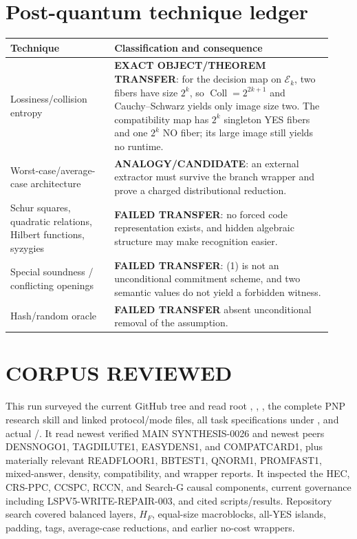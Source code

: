 \documentclass[11pt]{article}
\begin{document}
\section{Post-quantum technique ledger}
\begin{longtable}{p{0.30\linewidth}p{0.63\linewidth}}
\toprule Technique & Classification and consequence\\ \midrule\endhead
Lossiness/collision entropy & \textbf{EXACT OBJECT/THEOREM TRANSFER}: for
the decision map on \(\mathcal E_k\), two fibers have size \(2^k\), so
\(\operatorname{Coll}=2^{2k+1}\) and Cauchy--Schwarz yields only image size
two.  The compatibility map has \(2^k\) singleton YES fibers and one \(2^k\)
NO fiber; its large image still yields no runtime.\\
Worst-case/average-case architecture & \textbf{ANALOGY/CANDIDATE}: an
external extractor must survive the branch wrapper and prove a charged
distributional reduction.\\
Schur squares, quadratic relations, Hilbert functions, syzygies &
\textbf{FAILED TRANSFER}: no forced code representation exists, and hidden
algebraic structure may make recognition easier.\\
Special soundness / conflicting openings & \textbf{FAILED TRANSFER}: (1) is
not an unconditional commitment scheme, and two semantic values do not yield
a forbidden witness.\\
Hash/random oracle & \textbf{FAILED TRANSFER} absent unconditional removal of
the assumption.\\ \bottomrule
\end{longtable}

\section{CORPUS REVIEWED}
This run surveyed the current GitHub tree and read root ,
, , the complete PNP research skill and linked
protocol/mode files, all task specifications under , and actual
/.  It read newest verified MAIN
SYNTHESIS-0026 and newest peers DENSNOGO1, TAGDILUTE1, EASYDENS1, and
COMPATCARD1, plus materially relevant READFLOOR1, BBTEST1, QNORM1, PROMFAST1,
mixed-answer, density, compatibility, and wrapper reports.  It inspected the
HEC, CRS-PPC, CCSPC, RCCN, and Search-G causal components, current governance
including LSPV5-WRITE-REPAIR-003, and cited scripts/results.  Repository
search covered balanced layers, \(H_F\), equal-size macroblocks, all-YES
islands, padding, tags, average-case reductions, and earlier no-cost wrappers.
\end{document}
